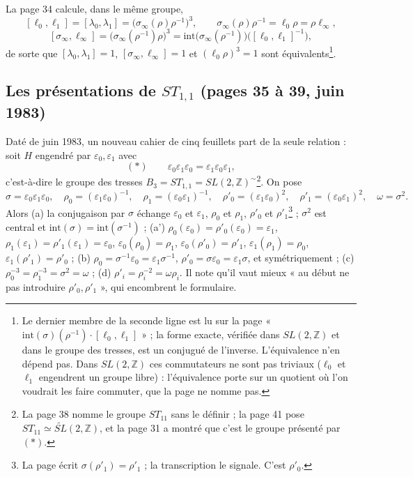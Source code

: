 \documentclass[11pt,a4paper]{article}
\begin{document}
La page 34 calcule, dans le même groupe,
\[
[\ell_0, \ell_1] = [\lambda_0, \lambda_1] = \bigl(\sigma_\infty(\rho)\rho^{-1}\bigr)^3, \qquad
\sigma_\infty(\rho)\rho^{-1} = \ell_0\rho = \rho\ell_\infty,
\]
\[
[\sigma_\infty, \ell_\infty] = \bigl(\sigma_\infty(\rho^{-1})\rho\bigr)^3
= \mathrm{int}\bigl(\sigma_\infty(\rho^{-1})\bigr)\bigl([\ell_0, \ell_1]^{-1}\bigr),
\]
de sorte que $[\lambda_0, \lambda_1] = 1$, $[\sigma_\infty, \ell_\infty] = 1$ et
$(\ell_0\rho)^3 = 1$ sont équivalents\footnote{Le dernier membre de la seconde
ligne est lu sur la page « $\mathrm{int}(\sigma)(\rho^{-1}) \cdot [\ell_0, \ell_1]$ » ;
la forme exacte, vérifiée dans $SL(2, \mathbb{Z})$ et dans le groupe des
tresses, est un conjugué de l'inverse. L'équivalence n'en dépend pas. Dans
$SL(2, \mathbb{Z})$ ces commutateurs ne sont pas triviaux ($\ell_0$ et $\ell_1$
engendrent un groupe libre) : l'équivalence porte sur un quotient où l'on
voudrait les faire commuter, que la page ne nomme pas.}.

\subsection*{Les présentations de $ST_{1,1}$ (pages 35 à 39, juin 1983)}

Daté de juin 1983, un nouveau cahier de cinq feuillets part de la seule
relation : soit $H$ engendré par $\varepsilon_0, \varepsilon_1$ avec
\[
(*)\qquad \varepsilon_0\varepsilon_1\varepsilon_0 = \varepsilon_1\varepsilon_0\varepsilon_1,
\]
c'est-à-dire le groupe des tresses $B_3 = ST_{1,1} = SL(2, \mathbb{Z})^{\sim}$\footnote{La
page 38 nomme le groupe $ST_{11}$ sans le définir ; la page 41 pose
$ST_{11} \simeq \widetilde{SL}(2, \mathbb{Z})$, et la page 31 a montré que c'est
le groupe présenté par $(*)$.}. On pose
\[
\sigma = \varepsilon_0\varepsilon_1\varepsilon_0, \quad
\rho_0 = (\varepsilon_1\varepsilon_0)^{-1}, \quad \rho_1 = (\varepsilon_0\varepsilon_1)^{-1}, \quad
\rho'_0 = (\varepsilon_1\varepsilon_0)^2, \quad \rho'_1 = (\varepsilon_0\varepsilon_1)^2, \quad
\omega = \sigma^2 .
\]
Alors (a) la conjugaison par $\sigma$ échange $\varepsilon_0$ et
$\varepsilon_1$, $\rho_0$ et $\rho_1$, $\rho'_0$ et $\rho'_1$\footnote{La page
écrit $\sigma(\rho'_1) = \rho'_1$ ; la transcription le signale. C'est
$\rho'_0$.} ; $\sigma^2$ est central et $\mathrm{int}(\sigma) = \mathrm{int}(\sigma^{-1})$ ;
(a') $\rho_0(\varepsilon_0) = \rho'_0(\varepsilon_0) = \varepsilon_1$,
$\rho_1(\varepsilon_1) = \rho'_1(\varepsilon_1) = \varepsilon_0$,
$\varepsilon_0(\rho_0) = \rho_1$, $\varepsilon_0(\rho'_0) = \rho'_1$,
$\varepsilon_1(\rho_1) = \rho_0$, $\varepsilon_1(\rho'_1) = \rho'_0$ ;
(b) $\rho_0 = \sigma^{-1}\varepsilon_0 = \varepsilon_1\sigma^{-1}$,
$\rho'_0 = \sigma\varepsilon_0 = \varepsilon_1\sigma$, et symétriquement ;
(c) $\rho_0^{-3} = \rho_1^{-3} = \sigma^2 = \omega$ ;
(d) $\rho'_i = \rho_i^{-2} = \omega\rho_i$. Il note qu'il vaut mieux « au
début ne pas introduire $\rho'_0, \rho'_1$ », qui encombrent le formulaire.
\end{document}
